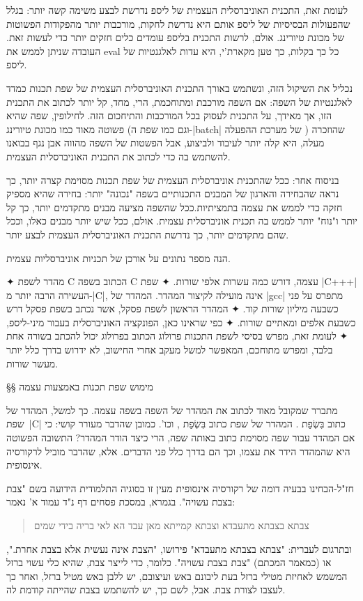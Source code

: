 לעומת זאת, התכנית האוניברסלית העצמית של ליספ נדרשת לבצע משימה קשה יותר: בגלל
שהפעולות הבסיסיות של ליספ אותם היא נדרשת לחקות, מורכבות יותר מהפקודות הפשוטות
של מכונת טיורינג. אולם, לרשות התכנית בליספ עומדים כלים חזקים יותר כדי לעשות
זאת. העובדה שניתן לממש את eval כל כך בקלות, כך טען מקארת'י, היא עדות לאלגנטיות
של ליספ.

נכליל את השיקול הזה, ונשתמש באורך התכנית האוניברסלית העצמית של שפת תכנות כמדד
לאלגנטיות של השפה: אם השפה מורכבת ומתוחכמת, הרי, מחד, קל יותר לכתוב את התכנית
הזו, אך מאידך, על התכנית לעסוק בכל המורכבות והתיחכום הזה. לחילופין, שפה שהיא
פשוטה מאוד כמו מכונת טיורינג (וגם כמו שפת ה-\E|batch| של מערכת ההפעלה )
שהוזכרה מעלה, היא קלה יותר לעיבוד ולביצוע, אבל הפשטות של השפה מהווה אבן נגף
בבואנו להשתמש בה כדי לכתוב את התכנית האוניברסלית העצמית.

בניסוח אחר: ככל שהתכנית אוניברסלית העצמית של שפת תכנות מסוימת קצרה יותר, כך
נראה שהבחירה והארגון של המבנים התכנותיים בשפה "נכונה" יותר: בחירה שהיא מספיק
חזקה כדי לממש את עצמה בתמציתיות.ככל שהשפה מציעה מבנים מתקדמים יותר, כך קל יותר
ו"נוח" יותר לממש בה תכנית אוניברסלית עצמית. אולם, ככל שיש יותר מבנים כאלו, וככל
שהם מתקדמים יותר, כך נדרשת התכנית האוניברסלית העצמית לבצע יותר.

הנה מספר נתונים על אורכן של תכניות אוניברסליות עצמית.
\begin{enumerate}
    ✦ מהדר לשפת C הכתוב בשפה C עצמה, דורש כמה עשרות אלפי שורות.
    ✦ שפת \E|C+++| העשירה הרבה יותר מ-\E|C|, אינה מועילה לקיצור המהדר. המהדר
    של \E|gcc| מתפרס על פני כשבעה מיליון שורות קוד.
    ✦ המהדר הראשון לשפת פסקל, אשר נכתב בשפת פסקל דרש כשבעת אלפים ומאתיים שורות.
    ✦ כפי שראינו כאן, הפונקציה האוניברסלית  בעבור מיני-ליספ,
    ✦ לעומת זאת, מפרש בסיסי לשפת התכנות פרולוג הכתוב בפרולוג יכול להכתב בשורה אחת בלבד, ומפרש מתוחכם,
המאפשר למשל מעקב אחרי החישוב, לא ידרוש בדרך כלל יותר מעשר שורות.
\end{enumerate}

§§ מימוש שפת תכנות באמצעות עצמה

מתברר שמקובל מאוד לכתוב את המהדר של השפה בשפה עצמה. כך למשל, המהדר של שפת~\E|C|
כתוב בִּשְׂפַת . המהדר של שפת  כתוב בִּשְׂפַת , וכו'. כמובן שהדבר מעורר
קושי: כי אם המהדר עבור שפה מסוימת כתוב באותה שפה, הרי כיצד הודר המהדר? התשובה
הפשוטה היא שהמהדר הידר את עצמו, וכך הם בדרך כלל פני הדברים. אלא, שהדבר מוביל
לרקורסיה אינסופית.

חז"ל-הבחינו בבעיה דומה של רקורסיה אינסופית מעין זו בסוגיה התלמודית הידועה בשם
"צבת בצבת עשויה". בגמרא, במסכת פסחים דף נ"ד עמוד א' נאמר:
\begin{quote}
צבתא בצבתא מתעבדא וצבתא קמייתא מאן עבד הא לאי בריה בידי שמים
\end{quote}
ובתרגום לעברית: "צבתא בצבתא מתעבדא" פירושו, "הצבת אינה נעשית אלא בצבת אחרת.",
או (כמאמר המכתם) "צבת בצבת עשויה". כלומר, כדי לייצר צבת, שהיא כלי עשוי ברזל
המשמש לאחיזת מטילי ברזל בעת ליבונם באש ועיצובם, יש ללבן באש מטיל ברזל, ואחר כך
לעצבו לצורת צבת. אבל, לשם כך, יש להשתמש בצבת שהייתה קודמת לה.

